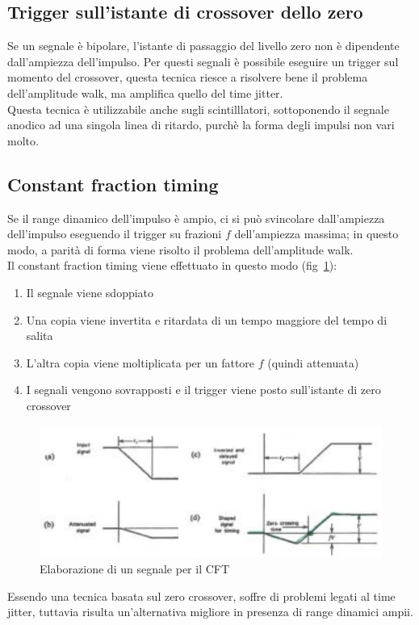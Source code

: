 \subsection{Trigger sull'istante di crossover dello zero}
Se un segnale \`e bipolare, l'istante di passaggio del livello zero non \`e dipendente dall'ampiezza dell'impulso.
Per questi segnali \`e possibile eseguire un trigger sul momento del crossover, questa tecnica riesce a risolvere bene il problema dell'amplitude walk,
ma amplifica quello del time jitter.\\
Questa tecnica \`e utilizzabile anche sugli scintilllatori, sottoponendo il segnale anodico ad una singola linea di ritardo, purch\`e la forma
degli impulsi non vari molto.
\subsection{Constant fraction timing}
Se il range dinamico dell'impulso \`e ampio, ci si pu\`o svincolare dall'ampiezza dell'impulso eseguendo il trigger su frazioni $f$ dell'ampiezza massima;
in questo modo, a parit\`a di forma viene risolto il problema dell'amplitude walk.\\
Il constant fraction timing viene effettuato in questo modo (fig~\ref{fig:CFT}):
\begin{enumerate}
\item Il segnale viene sdoppiato
\item Una copia viene invertita e ritardata di un tempo maggiore del tempo di salita
\item L'altra copia viene moltiplicata per un fattore $f$ (quindi attenuata)
\item I segnali vengono sovrapposti e il trigger viene posto sull'istante di zero crossover
\end{enumerate}
\begin{figure}[htbp]
\begin{center}
\includegraphics[scale=0.8]{./Immagini/CFT.png}
\caption{Elaborazione di un segnale per il CFT}
\label{fig:CFT}
\end{center}
\end{figure}
Essendo una tecnica basata sul zero crossover, soffre di problemi legati al time jitter, tuttavia risulta un'alternativa migliore in presenza di range dinamici ampii.
